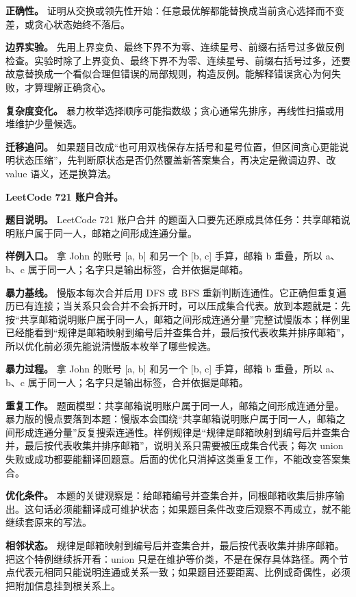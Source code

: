 \textbf{正确性。} 证明从交换或领先性开始：任意最优解都能替换成当前贪心选择而不变差，或贪心状态始终不落后。

\textbf{边界实验。} 先用上界变负、最终下界不为零、连续星号、前缀右括号过多做反例检查。实验时除了上界变负、最终下界不为零、连续星号、前缀右括号过多，还要故意替换成一个看似合理但错误的局部规则，构造反例。能解释错误贪心为何失败，才算理解正确贪心。

\textbf{复杂度变化。} 暴力枚举选择顺序可能指数级；贪心通常先排序，再线性扫描或用堆维护少量候选。

\textbf{迁移追问。} 如果题目改成“也可用双栈保存左括号和星号位置，但区间贪心更能说明状态压缩”，先判断原状态是否仍然覆盖新答案集合，再决定是微调边界、改 value 语义，还是换算法。

\noindent\textbf{LeetCode 721 账户合并。}

\textbf{题目说明。} LeetCode 721 账户合并 的题面入口要先还原成具体任务：共享邮箱说明账户属于同一人，邮箱之间形成连通分量。

\textbf{样例入口。} 拿 John 的账号 [a, b] 和另一个 [b, c] 手算，邮箱 b 重叠，所以 a、b、c 属于同一人；名字只是输出标签，合并依据是邮箱。

\textbf{暴力基线。} 慢版本每次合并后用 DFS 或 BFS 重新判断连通性。它正确但重复遍历已有连接；当关系只会合并不会拆开时，可以压成集合代表。放到本题就是：先按“共享邮箱说明账户属于同一人，邮箱之间形成连通分量”完整试慢版本；样例里已经能看到“规律是邮箱映射到编号后并查集合并，最后按代表收集并排序邮箱”，所以优化前必须先能说清慢版本枚举了哪些候选。

\textbf{暴力过程。} 拿 John 的账号 [a, b] 和另一个 [b, c] 手算，邮箱 b 重叠，所以 a、b、c 属于同一人；名字只是输出标签，合并依据是邮箱。

\textbf{重复工作。} 题面模型：共享邮箱说明账户属于同一人，邮箱之间形成连通分量。暴力版的慢点要落到本题：慢版本会围绕“共享邮箱说明账户属于同一人，邮箱之间形成连通分量”反复搜索连通性。样例规律是“规律是邮箱映射到编号后并查集合并，最后按代表收集并排序邮箱”，说明关系只需要被压成集合代表；每次 union 失败或成功都要能翻译回题意。后面的优化只消掉这类重复工作，不能改变答案集合。

\textbf{优化条件。} 本题的关键观察是：给邮箱编号并查集合并，同根邮箱收集后排序输出。这句话必须能翻译成可维护状态；如果题目条件改变后观察不再成立，就不能继续套原来的写法。

\textbf{相邻状态。} 规律是邮箱映射到编号后并查集合并，最后按代表收集并排序邮箱。把这个特例继续拆开看：union 只是在维护等价类，不是在保存具体路径。两个节点代表元相同只能说明连通或关系一致；如果题目还要距离、比例或奇偶性，必须把附加信息挂到根关系上。


